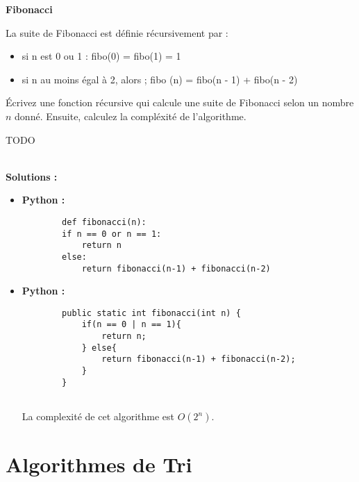 \begin{Exercice} [10 minutes] \textbf{Fibonacci}

La suite de Fibonacci est définie récursivement par :
\begin{itemize}
    \item si n est 0 ou 1 : fibo(0) = fibo(1) = 1
    \item si n au moins égal à 2, alors ; fibo (n) = fibo(n - 1) + fibo(n - 2)
\end{itemize}

Écrivez une fonction récursive qui calcule une suite de Fibonacci selon un nombre $n$ donné. Ensuite, calculez la compléxité de l'algorithme.

\begin{Conseil}
TODO
\end{Conseil}
\ \\

\textbf{Solutions :}
\begin{itemize}
    \item \textbf{Python :}
    \begin{verbatim}
        def fibonacci(n):
        if n == 0 or n == 1:
            return n
        else:
            return fibonacci(n-1) + fibonacci(n-2)
    \end{verbatim}
    
    \item \textbf{Python :}
    \begin{verbatim}
        public static int fibonacci(int n) {
            if(n == 0 | n == 1){
                return n;
            } else{
                return fibonacci(n-1) + fibonacci(n-2);
            }
        }
        
    \end{verbatim}
    
    La complexité de cet algorithme est $O(2^n)$.
    
\end{itemize}

\end{Exercice}

\section{Algorithmes de Tri}

